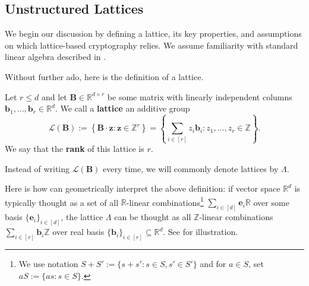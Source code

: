 \documentclass[../../book.tex]{subfiles}
\begin{document}
\subsection{Unstructured Lattices}\label{subsection:lattices}

We begin our discussion by defining a lattice, its key properties, and assumptions on which lattice-based cryptography relies.
We assume familiarity with standard linear algebra described in .

Without further ado, here is the definition of a lattice.

\begin{definition}\label{def:lattice}
    Let $r \leq d$ and let $\mathbf{B} \in \mathbb{R}^{d \times r}$ be some matrix with linearly independent columns $\mathbf{b}_1,\dots,\mathbf{b}_r \in \mathbb{R}^d$.
    We call a \textbf{lattice} an additive group 
    \begin{equation*}
        \mathcal{L}(\mathbf{B}) := \left\{\mathbf{B}\cdot\mathbf{z}: \mathbf{z} \in \mathbb{Z}^r\right\} = \left\{\sum_{i \in [r]}z_i\mathbf{b}_i: z_1,\dots,z_r \in \mathbb{Z}\right\}.    
    \end{equation*}
    We say that the \textbf{rank} of this lattice is $r$.
\end{definition}

Instead of writing $\mathcal{L}(\mathbf{B})$ every time, we will commonly denote lattices by $\Lambda$.

Here is how can geometrically interpret the above definition: if vector space $\mathbb{R}^d$ is typically thought as a set of all $\mathbb{R}$-linear combinations\footnote{We use notation $S+S':=\{s+s': s \in S, s' \in S'\}$ and for $a \in S$, set $aS := \{as: s \in S\}$.} $\sum_{i \in [d]}\mathbf{e}_i\mathbb{R}$ over some basis $\{\mathbf{e}_i\}_{i \in [d]}$, the lattice $\Lambda$ can be thought as all $\mathbb{Z}$-linear combinations $\sum_{i \in [r]}\mathbf{b}_i\mathbb{Z}$ over real basis $\{\mathbf{b}_i\}_{i \in [r]} \subseteq \mathbb{R}^d$.
See  for illustration.
\end{document}
